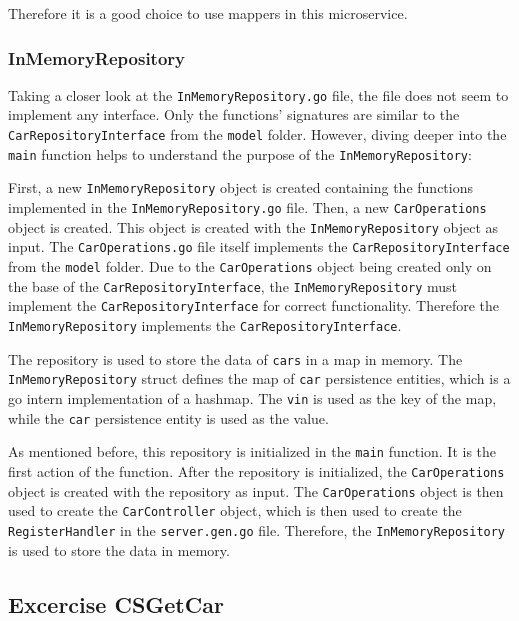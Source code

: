 Therefore it is a good choice to use mappers in this microservice.

\subsubsection*{InMemoryRepository}
Taking a closer look at the \texttt{InMemoryRepository.go} file, the file does not seem to implement any interface.
Only the functions' signatures are similar to the \texttt{CarRepositoryInterface} from the \texttt{model} folder.
However, diving deeper into the \texttt{main} function helps to understand the purpose of the \texttt{InMemoryRepository}:

First, a new \texttt{InMemoryRepository} object is created containing the functions implemented in the \texttt{InMemoryRepository.go} file.
Then, a new \texttt{CarOperations} object is created.
This object is created with the \texttt{InMemoryRepository} object as input.
The \texttt{CarOperations.go} file itself implements the \texttt{CarRepositoryInterface} from the \texttt{model} folder.
Due to the \texttt{CarOperations} object being created only on the base of the \texttt{CarRepositoryInterface}, the \texttt{InMemoryRepository} must implement the \texttt{CarRepositoryInterface} for correct functionality.
Therefore the \texttt{InMemoryRepository} implements the \texttt{CarRepositoryInterface}.

The repository is used to store the data of \texttt{cars} in a map in memory.
The \texttt{InMemoryRepository} struct defines the map of \texttt{car} persistence entities, which is a go intern implementation of a hashmap.
The \texttt{vin} is used as the key of the map, while the \texttt{car} persistence entity is used as the value.

As mentioned before, this repository is initialized in the \texttt{main} function.
It is the first action of the function.
After the repository is initialized, the \texttt{CarOperations} object is created with the repository as input.
The \texttt{CarOperations} object is then used to create the \texttt{CarController} object, which is then used to create the \texttt{RegisterHandler} in the \texttt{server.gen.go} file.
Therefore, the \texttt{InMemoryRepository} is used to store the data in memory.

\subsection{Excercise CSGetCar}
